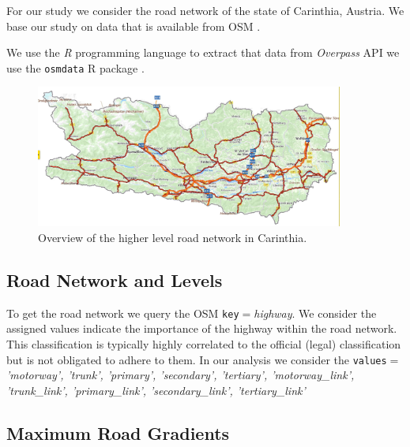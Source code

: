 %


For our study we consider the road network of the state of Carinthia, Austria.
We base our study on data that is available from OSM \cite{OpenStreetMap}.

We use the \emph{R} programming language \cite{RVienna} to extract that data from
\emph{Overpass} API we use the \texttt{osmdata} R package \cite{osmdataR20221}.


\begin{figure}[!ht]
  \centering
  \includegraphics[width=0.9\textwidth]{map.jpg}
  \caption{Overview of the higher level road network in Carinthia.}
  \label{fig:higher level}
\end{figure}


\subsection{Road Network and Levels}
To get the road network we query the OSM \texttt{key}$=$\textit{highway}. We consider the
assigned values indicate the importance of the highway within the road network.
This classification is typically highly correlated to the official (legal) classification
but is not obligated to adhere to them. In our analysis we consider the
\texttt{values}$=$
\textit{'motorway', 'trunk', 'primary', 'secondary', 'tertiary', 'motorway\_link', 'trunk\_link', 'primary\_link', 'secondary\_link', 'tertiary\_link'}

\subsection{Maximum Road Gradients}

